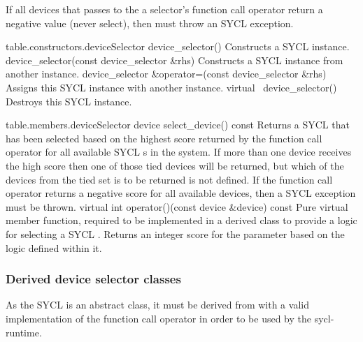 If all devices that  passes to the a selector's function call operator return a negative value (never select), then  must throw an  SYCL exception.

{table.constructors.deviceSelector}
\addRow
{device_selector()}
{
  Constructs a SYCL instance.
}
\addRow
{device_selector(const device_selector \&rhs)}
{
  Constructs a SYCL  instance from another instance.
}
\addRow
{device_selector \&operator=(const device_selector \&rhs)}
{
  Assigns this SYCL  instance with another instance.
}
\addRow
{virtual ~device_selector()}
{
  Destroys this SYCL  instance.
}
\completeTable


{table.members.deviceSelector}
\addRow
{device select_device() const}
{
  Returns a SYCL  that has been selected based on the highest score returned by the function call operator for all available SYCL s in the system.  If more than one device receives the high score then one of those tied devices will be returned, but which of the devices from the tied set is to be returned is not defined.  If the function call operator returns a negative score for all available devices, then a  SYCL exception must be thrown.
}
\addRow
{virtual int operator()(const device \&device) const}
{
  Pure virtual member function, required to be implemented in a derived class to provide a logic for selecting a SYCL .
  Returns an integer score for the  parameter based on the logic defined within it.
}
\completeTable

\subsubsection{Derived device selector classes}

As the SYCL  is an abstract class, it must be derived from with a valid implementation of the function call operator in order to be used by the \gls{sycl-runtime}.

